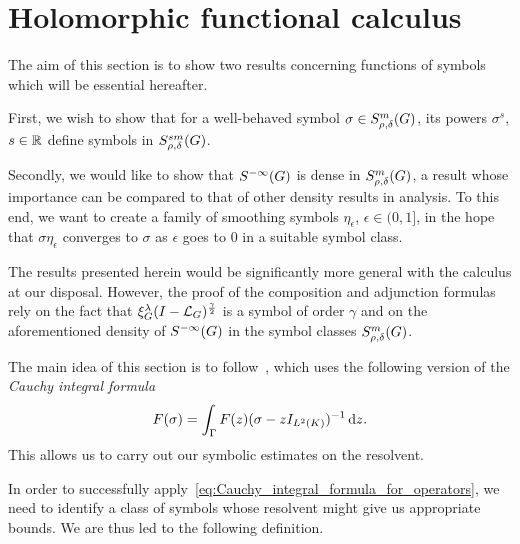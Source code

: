 \section{Holomorphic functional calculus}

The aim of this section is to show two results concerning functions of symbols which will be essential hereafter.

First, we wish to show that for a well-behaved symbol $\sigma \in S^{m}_{\rho, \delta}(G)$,
its powers $\sigma^s$, $s \in \mathbb{R}$ define symbols in $S^{s m}_{\rho, \delta}(G)$.

Secondly, we would like to show that ${S^{-\infty} (G)}$ is dense in $S^{m}_{\rho, \delta}(G)$,
a result whose importance can be compared to that of other density results in analysis.
To this end, we want to create a family of smoothing symbols $\eta_\epsilon$, $\epsilon \in (0, 1]$, in the hope
that $\sigma \eta_\epsilon$ converges to $\sigma$ as $\epsilon$ goes to $0$ in a suitable symbol class.

The results presented herein would be significantly more general with the calculus at our disposal.
However, the proof of the composition and adjunction formulas rely on the fact that $\xi^{\lambda}_{G} (I - {\mathcal{L}_{G}})^\frac{\gamma}{2}$ is a symbol of order $\gamma$
and on the aforementioned density of ${S^{-\infty} (G)}$ in the symbol classes $S^{m}_{\rho, \delta}(G)$.

The main idea of this section is to follow~\cite{RuzhanskyWirth14},
which uses the following version of the \emph{Cauchy integral formula}
\begin{align}
    F(\sigma) = \int_\Gamma F(z) (\sigma - z{I_{{L^{2} (K)}}})^{-1} \,\mathrm{d} z.
    \label{eq:Cauchy_integral_formula_for_operators}
\end{align}
This allows us to carry out our symbolic estimates on the resolvent.

In order to successfully apply~\eqref{eq:Cauchy_integral_formula_for_operators},
we need to identify a class of symbols whose resolvent might give us appropriate bounds.
We are thus led to the following definition.

